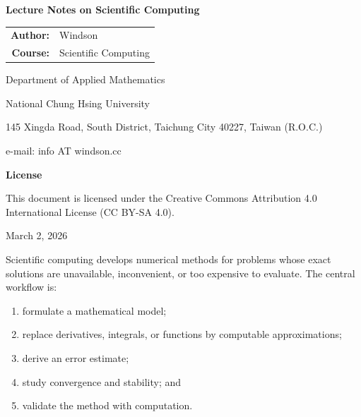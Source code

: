 \documentclass[12pt, a4paper]{article}
\theoremstyle{break}
\providecommand{\tightlist}{\setlength{\itemsep}{0pt}\setlength{\parskip}{0pt}}
\begin{document}
\begin{titlepage}
    \begin{center}
        \vspace*{2cm}
        {\LARGE \bfseries Lecture Notes on Scientific Computing \par}
        \vspace{3cm}
        \begin{tabular}{rl}
            \textbf{Author:} & Windson \\
            \textbf{Course:} & Scientific Computing \\
        \end{tabular}
        \vspace{1.5cm}

        {\large Department of Applied Mathematics \par}
        {\large National Chung Hsing University \par}
        \vspace{0.3cm}
        145 Xingda Road, South District, Taichung City 40227, Taiwan (R.O.C.) \par
        e-mail: info AT windson.cc

        \vfill
        {\large \textbf{License} \par}
        {\small This document is licensed under the Creative Commons Attribution 4.0 International License (CC BY-SA 4.0).\par}
        \vspace{1cm}
        {\large March 2, 2026 \par}
    \end{center}
\end{titlepage}

\tableofcontents
\clearpage
{}
\setcounter{page}{1}

Scientific computing develops numerical methods for problems whose exact solutions are unavailable, inconvenient, or too expensive to evaluate. The central workflow is:

\begin{enumerate}
\def\labelenumi{\arabic{enumi}.}
\tightlist
\item
  formulate a mathematical model;
\item
  replace derivatives, integrals, or functions by computable approximations;
\item
  derive an error estimate;
\item
  study convergence and stability; and
\item
  validate the method with computation.
\end{enumerate}
\end{document}
